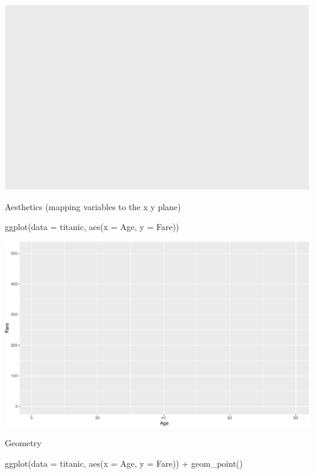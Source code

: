 \documentclass[
]{book}
\newenvironment{Shaded}{\begin{snugshade}}{\end{snugshade}}
\newcommand{\AttributeTok}[1]{\textcolor[rgb]{0.77,0.63,0.00}{#1}}
\newcommand{\FunctionTok}[1]{\textcolor[rgb]{0.00,0.00,0.00}{#1}}
\newcommand{\NormalTok}[1]{#1}
\newcommand{\SpecialCharTok}[1]{\textcolor[rgb]{0.00,0.00,0.00}{#1}}
\begin{document}
\includegraphics{figures/unnamed-chunk-134-1.pdf}

Aesthetics (mapping variables to the x y plane)

\begin{Shaded}
\begin{Highlighting}[]
\FunctionTok{ggplot}\NormalTok{(}\AttributeTok{data =}\NormalTok{ titanic, }\FunctionTok{aes}\NormalTok{(}\AttributeTok{x =}\NormalTok{ Age, }\AttributeTok{y =}\NormalTok{ Fare))}
\end{Highlighting}
\end{Shaded}

\includegraphics{figures/unnamed-chunk-135-1.pdf}

Geometry

\begin{Shaded}
\begin{Highlighting}[]
\FunctionTok{ggplot}\NormalTok{(}\AttributeTok{data =}\NormalTok{ titanic, }\FunctionTok{aes}\NormalTok{(}\AttributeTok{x =}\NormalTok{ Age, }\AttributeTok{y =}\NormalTok{ Fare)) }\SpecialCharTok{+} \FunctionTok{geom\_point}\NormalTok{()}
\end{Highlighting}
\end{Shaded}
\end{document}
